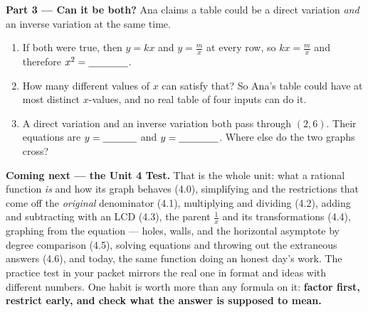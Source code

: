 \documentclass[10pt]{article}
\begin{document}
\begin{extensionbox}
\vspace{4pt}
\textbf{Part 3 --- Can it be both?} Ana claims a table could be a direct variation \emph{and} an
inverse variation at the same time.
\begin{enumerate}[label=(\alph*), leftmargin=2.1em, itemsep=4pt]
  \item If both were true, then $y=kx$ and $y=\frac mx$ at every row, so $kx=\frac mx$ and therefore
        $x^2=\blank{1.4cm}$.
  \item How many different values of $x$ can satisfy that? \blank{1.2cm} \; So Ana's table could
        have at most \blank{1.2cm} distinct $x$-values, and no real table of four inputs can do it.
  \item A direct variation and an inverse variation both pass through $(2,6)$. Their equations are
        $y=\blank{1.2cm}$ and $y=\blank{1.4cm}$. Where else do the two graphs cross?
        \blank{2.4cm}
\end{enumerate}
\end{extensionbox}

\begin{spiralbox}
\textbf{Coming next --- the Unit 4 Test.} That is the whole unit: what a rational function \emph{is}
and how its graph behaves (4.0), simplifying and the restrictions that come off the \emph{original}
denominator (4.1), multiplying and dividing (4.2), adding and subtracting with an LCD (4.3), the parent
$\frac1x$ and its transformations (4.4), graphing from the equation --- holes, walls, and the
horizontal asymptote by degree comparison (4.5), solving equations and throwing out the extraneous
answers (4.6), and today, the same function doing an honest day's work. The practice test in your
packet mirrors the real one in format and ideas with different numbers. One habit is worth more than
any formula on it: \textbf{factor first, restrict early, and check what the answer is supposed to
mean.}
\end{spiralbox}
\end{document}
